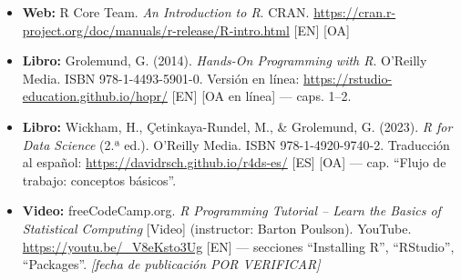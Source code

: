 \begin{itemize}
\tightlist
\item
  \textbf{Web:} R Core Team. \emph{An Introduction to R}. CRAN.
  \url{https://cran.r-project.org/doc/manuals/r-release/R-intro.html}
  {[}EN{]} {[}OA{]}
\item
  \textbf{Libro:} Grolemund, G. (2014). \emph{Hands-On Programming with
  R}. O'Reilly Media. ISBN 978-1-4493-5901-0. Versión en línea:
  \url{https://rstudio-education.github.io/hopr/} {[}EN{]} {[}OA en
  línea{]} --- caps. 1--2.
\item
  \textbf{Libro:} Wickham, H., Çetinkaya-Rundel, M., \& Grolemund, G.
  (2023). \emph{R for Data Science} (2.ª ed.). O'Reilly Media. ISBN
  978-1-4920-9740-2. Traducción al español:
  \url{https://davidrsch.github.io/r4ds-es/} {[}ES{]} {[}OA{]} --- cap.
  ``Flujo de trabajo: conceptos básicos''.
\item
  \textbf{Video:} freeCodeCamp.org. \emph{R Programming Tutorial --
  Learn the Basics of Statistical Computing} {[}Video{]} (instructor:
  Barton Poulson). YouTube. \url{https://youtu.be/_V8eKsto3Ug} {[}EN{]}
  --- secciones ``Installing R'', ``RStudio'', ``Packages''.
  \emph{{[}fecha de publicación POR VERIFICAR{]}}
\end{itemize}
